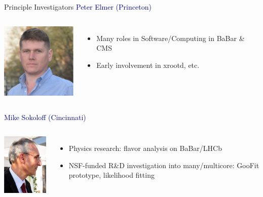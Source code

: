 \documentclass{beamer}
\begin{document}
\begin{frame}{Principle Investigators}
\hspace{-0.6 cm}\textcolor{darkblue}{\large Peter Elmer (Princeton)}

\vspace{0.25 cm}
\begin{columns}
\includegraphics[height=2 cm]{peter_elmer.png}

\begin{itemize}
\item Many roles in Software/Computing in BaBar \& CMS
\item Early involvement in xrootd, etc.
\end{itemize}
\end{columns}

\vspace{1 cm}
\hspace{-0.6 cm}\textcolor{darkblue}{\large Mike Sokoloff (Cincinnati)}

\vspace{0.25 cm}
\begin{columns}
\includegraphics[height=2 cm]{mike_sokoloff.png}

\begin{itemize}
\item Physics research: flavor analysis on BaBar/LHCb
\item NSF-funded R\&D investigation into many/multicore: GooFit prototype, likelihood fitting
\end{itemize}
\end{columns}
\end{frame}
\end{document}
